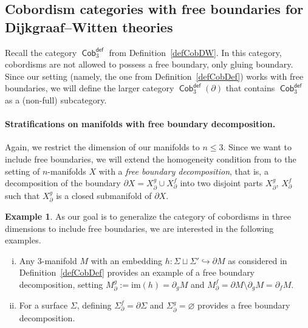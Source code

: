 \documentclass[10pt,a4paper]{amsart}
\DeclareMathOperator{\Cob}{\mathsf{Cob}}
\numberwithin{equation}{section}
\theoremstyle{definition}
\newtheorem{Example}[Example]{Example}
\begin{document}
\subsection{Cobordism categories with free boundaries for Dijkgraaf--Witten theories}
\label{subSecFB}
Recall the category $\Cob_3^{\mathsf{def}}$ from Definition~\ref{defCobDW}. In this category, cobordisms are not allowed to possess a free boundary, only gluing boundary. Since our setting (namely, the one from Definition~\ref{defCobDef}) works with free boundaries, we will define the larger category $\Cob_3^{\mathsf{def}}(\partial)$ that contains $\Cob_3^{\mathsf{def}}$ as a (non-full) subcategory.

\paragraph{Stratifications on manifolds with free boundary decomposition.} Again, we restrict the dimension of our manifolds to $n \leq 3$. Since we want to include free boundaries, we will extend the homogeneity condition from \cite[Definition~3.7]{FMM} to the setting of $n$-manifolds $X$ with a \textit{free boundary decomposition}, that is, a decomposition of the boundary $\partial X = X_{\partial}^g \cup X_{\partial}^f$ into two disjoint parts $X_{\partial}^g$, $X_{\partial}^f$ such that $X_{\partial}^g$ is a closed submanifold of $\partial X$.
\begin{Example} \label{exBound}
 As our goal is to generalize the category of cobordisms in three dimensions to include free boundaries, we are interested in the following examples.
 \begin{enumerate}[(i)]\itemsep=0pt
 \item \label{exFreeBoundCob} Any 3-manifold $M$ with an embedding $h\colon \Sigma \sqcup \Sigma' \hookrightarrow \partial M$ as considered in Definition~\ref{defCobDef} provides an example of a free boundary decomposition, setting $M_{\partial}^g := \mathrm{im}(h) = \partial_gM$ and $M_{\partial}^f = \partial M \setminus \partial _g M = \partial_fM$.
 \item \label{exFreeBoundSurf} For a surface $\Sigma$, defining $\Sigma_{\partial}^f = \partial \Sigma$ and $\Sigma_{\partial}^g = \varnothing$ provides a free boundary decomposition.
 \end{enumerate}
\end{Example}
\end{document}
